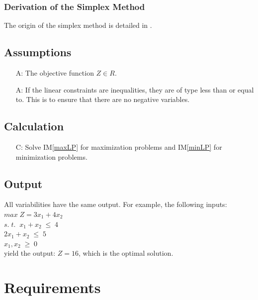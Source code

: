 \documentclass[12pt]{article}
\newcounter{assumpnum} %
\newcounter{calcnum} %
\newcommand{\iref}[1]{IM\ref{#1}}
\newcounter{lcnum} %
\begin{document}
\subsubsection*{Derivation of the Simplex Method}{
	The origin of the simplex method is detailed in \cite{simplex-origin}. 
}

\subsection{Assumptions}

\begin{itemize}
	\item[A\refstepcounter{assumpnum}\theassumpnum \label{A_objFunSpace}:] The 
	objective function $Z \in R$.
	
	\item[A\refstepcounter{assumpnum}\theassumpnum \label{A_inequalities}:] If 
	the linear constraints are inequalities, they are of type less than or 
	equal to. This is to ensure that there are no negative variables.
\end{itemize}

\subsection{Calculation} \label{sec_Calculation}

\begin{itemize}
	\item[C\refstepcounter{calcnum}\thecalcnum \label{calculation}:] Solve 
	\iref{maxLP} for maximization problems and \iref{minLP} for minimization 
	problems.
\end{itemize}

\subsection{Output} \label{sec_Output}

All variabilities have the same output. For example, the following inputs:\\
$max\;Z = 3x_1 + 4x_2$\\ \hspace{10mm}
\indent $s.\;t.\;\;x_1 + x_2\;\leq\;4$\\
\indent \indent $2x_1 + x_2\;\leq\;5$\\
\indent \indent $x_1, x_2\;\geq\;0$\\
yield the output: $Z = 16$, which is the optimal solution.

\section{Requirements} \label{Sec_Requirements}
\end{document}
